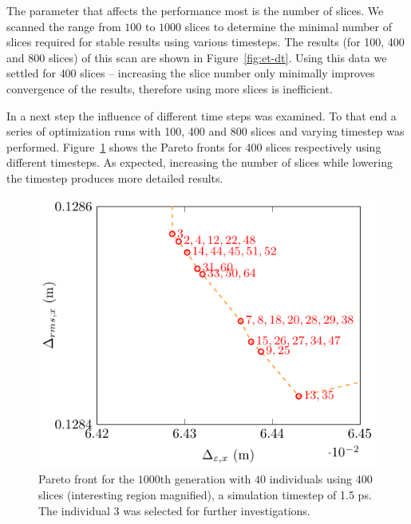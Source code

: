 The parameter that affects the performance most is the number of slices.
We scanned the range from $100$ to $1000$ slices to determine the minimal
  number of slices required for stable results using various timesteps.
The results (for 100, 400 and 800 slices) of this scan are shown in
  Figure~\ref{fig:et-dt}.
Using this data we settled for $400$ slices -- increasing the slice number
  only minimally improves convergence of the results, therefore using more
  slices is inefficient.



In a next step the influence of different time steps was examined.
To that end a series of optimization runs with 100, 400 and 800 slices and
  varying timestep was performed.
Figure~\ref{fig:pareto_front_21} shows the Pareto fronts for 400 slices
  respectively using different timesteps.
As expected, increasing the number of slices while lowering the timestep
  produces more detailed results.


\begin{figure}[h!]
  \centering
    \includegraphics[width=0.8\linewidth]{Report/front_plot}
  \caption{Pareto front for the $1000$th generation with $40$ individuals
    using 400 slices (interesting region magnified), a simulation timestep
    of 1.5 ps.
    The individual 3 was selected for further investigations.}
  \label{fig:pareto_front_21}
\end{figure}


